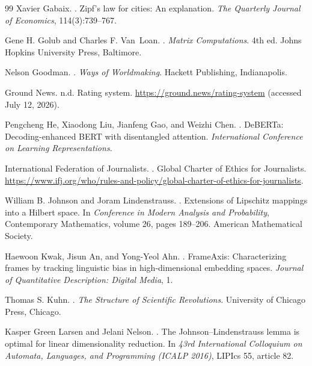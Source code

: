 \documentclass[12pt]{article}
\begin{document}
\begin{thebibliography}{99}
Xavier Gabaix.
.
\newblock Zipf's law for cities: An explanation.
\newblock \emph{The Quarterly Journal of Economics}, 114(3):739--767.

Gene H. Golub and Charles F. Van~Loan.
.
\newblock \emph{Matrix Computations}.
\newblock 4th ed. Johns Hopkins University Press, Baltimore.

Nelson Goodman.
.
\newblock \emph{Ways of Worldmaking}.
\newblock Hackett Publishing, Indianapolis.

Ground News.
\newblock n.d.
\newblock Rating system.
\newblock \url{https://ground.news/rating-system} (accessed July 12, 2026).

Pengcheng He, Xiaodong Liu, Jianfeng Gao, and Weizhi Chen.
.
\newblock DeBERTa: Decoding-enhanced BERT with disentangled attention.
\newblock \emph{International Conference on Learning Representations}.

International Federation of Journalists.
.
\newblock Global Charter of Ethics for Journalists.
\newblock \url{https://www.ifj.org/who/rules-and-policy/global-charter-of-ethics-for-journalists}.

William B. Johnson and Joram Lindenstrauss.
.
\newblock Extensions of Lipschitz mappings into a Hilbert space.
\newblock In \emph{Conference in Modern Analysis and Probability}, Contemporary Mathematics, volume 26, pages 189--206. American Mathematical Society.

Haewoon Kwak, Jisun An, and Yong-Yeol Ahn.
.
\newblock FrameAxis: Characterizing frames by tracking linguistic bias in high-dimensional embedding spaces.
\newblock \emph{Journal of Quantitative Description: Digital Media}, 1.

Thomas S. Kuhn.
.
\newblock \emph{The Structure of Scientific Revolutions}.
\newblock University of Chicago Press, Chicago.

Kasper Green Larsen and Jelani Nelson.
.
\newblock The Johnson--Lindenstrauss lemma is optimal for linear dimensionality reduction.
\newblock In \emph{43rd International Colloquium on Automata, Languages, and Programming (ICALP 2016)}, LIPIcs 55, article 82.


\end{thebibliography}
\end{document}
